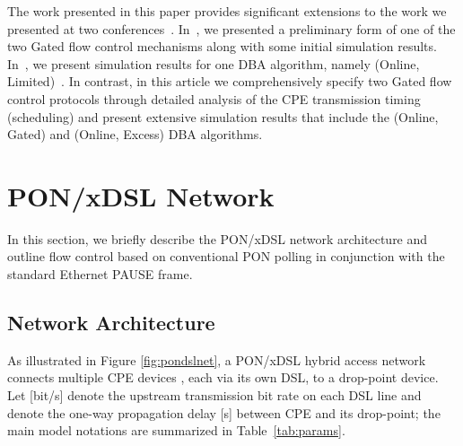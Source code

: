 \documentclass[pdftex,journal]{IEEEtran}
\begin{document}
The work presented in this paper provides significant extensions to the work
we presented at two conferences~\cite{MGL1213,MGMR1115}. In~\cite{MGL1213},
we presented a preliminary form of one of the two Gated flow control
mechanisms along with some initial simulation results. In~\cite{MGMR1115},
we present simulation results for one DBA algorithm,
namely (Online, Limited)~\cite{KMP0202,ZM0709}.
In contrast, in this article we comprehensively specify two
Gated flow control protocols through detailed analysis of the CPE
transmission timing (scheduling) and present extensive simulation results
that include the (Online, Gated) and (Online, Excess) DBA algorithms.


\section{PON/xDSL Network}  \label{sec:polling}
In this section, we briefly describe the PON/xDSL network architecture
and outline flow control based on conventional PON polling in
conjunction with the standard Ethernet PAUSE frame.

\subsection{Network Architecture}
As illustrated in Figure \ref{fig:pondslnet}, a PON/xDSL hybrid access
network connects multiple CPE devices , each
via its own DSL, to a drop-point device. Let  [bit/s] denote the
upstream transmission bit rate on each DSL line and  denote the
one-way propagation delay [s] between CPE  and its drop-point;
the main model notations are summarized in Table~\ref{tab:params}.
\end{document}
